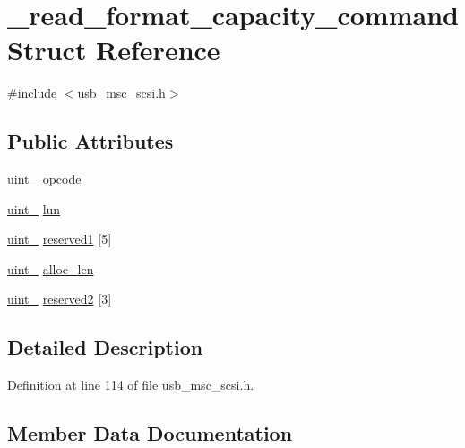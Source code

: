 \hypertarget{struct__read__format__capacity__command}{}\section{\+\_\+read\+\_\+format\+\_\+capacity\+\_\+command Struct Reference}
\label{struct__read__format__capacity__command}


{\ttfamily \#include $<$usb\+\_\+msc\+\_\+scsi.\+h$>$}

\subsection*{Public Attributes}
\begin{DoxyCompactItemize}
\item 
\hyperlink{types_8h_ad3209046c23f739a81581c10a4be7d92}{uint\+\_} \hyperlink{struct__read__format__capacity__command_a94a373bdad8b7f07d7a43419efb3e9cc}{opcode}
\item 
\hyperlink{types_8h_ad3209046c23f739a81581c10a4be7d92}{uint\+\_} \hyperlink{struct__read__format__capacity__command_ac04ecd062a0b3305716adae9b8150600}{lun}
\item 
\hyperlink{types_8h_ad3209046c23f739a81581c10a4be7d92}{uint\+\_} \hyperlink{struct__read__format__capacity__command_a9276d48b097e089f3da46b12183be1d4}{reserved1} \mbox{[}5\mbox{]}
\item 
\hyperlink{types_8h_a8ab774e38493b7c7e4d8edfd5004e66b}{uint\+\_} \hyperlink{struct__read__format__capacity__command_a5fcf0fe443ebd2f09d10c61ba98b144c}{alloc\+\_\+len}
\item 
\hyperlink{types_8h_ad3209046c23f739a81581c10a4be7d92}{uint\+\_} \hyperlink{struct__read__format__capacity__command_aedbf0fdddfce142da7648fe1f4c60688}{reserved2} \mbox{[}3\mbox{]}
\end{DoxyCompactItemize}


\subsection{Detailed Description}


Definition at line 114 of file usb\+\_\+msc\+\_\+scsi.\+h.



\subsection{Member Data Documentation}
